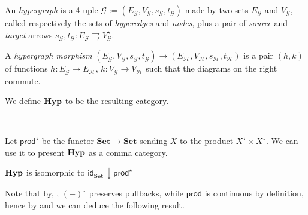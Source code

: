 \documentclass[3p]{elsarticle}
\newcommand{\Set}{\mathbf{Set}}
\def\E{\textbf {\textup{E}}}
\newcommand{\catname}[1]{\textbf{\textup{#1}}}
\newcommand{\hyp}{\catname{Hyp}}
\newcommand{\pro}{\mathsf{prod}}
\renewcommand{\comma}[2]{#1\hspace{1pt} {\downarrow}#2}
\newcommand{\id}[1]{\mathsf{id}_{#1}}
\theoremstyle{remark}
\theoremstyle{definition}
\begin{document}
\noindent
\begin{minipage}[l]{.83\linewidth}
	\setlength{\parindent}{1.5em}
	\begin{defi}An \emph{hypergraph} is a 4-uple $\mathcal{G}:=(E_\mathcal{G}, V_\mathcal{G}, s_\mathcal{G}, t_\mathcal{G})$ made by two sets $E_\mathcal{G}$ and $V_\mathcal{G}$, called respectively the sets of \emph{hyperedges} and \emph{nodes}, plus a pair of \emph{source} and \emph{target} arrows  $s_\mathcal{G}, t_\mathcal{G}\colon E_\mathcal{G}\rightrightarrows V_\mathcal{G}^\star$. 
		
A \emph{hypergraph morphism} $(E_\mathcal{G}, V_\mathcal{G}, s_\mathcal{G}, t_\mathcal{G})\to (E_\mathcal{H}, V_\mathcal{H}, s_\mathcal{H}, t_\mathcal{H})$ is a pair $(h,k)$ of functions $h\colon E_\mathcal{G}\to E_\mathcal{H}$, $k\colon V_\mathcal{G}\to V_\mathcal{H}$ such that the diagrams on the right commute.

We define $\hyp$ to be the resulting category.
\end{defi}\end{minipage} \hfill 
\begin{minipage}[r]{.15\linewidth}
 \hspace{1pt}\\  
\end{minipage}

Let $\pro^\star$ be the functor $\Set\to \Set$ sending $X$ to the product $X^\star\times X^\star$.  We can use it to present $\hyp$ as a comma category.

\begin{prop}\label{prop:com}
	$\hyp$ is isomorphic to $\comma{\id{\Set}}{\pro^\star}$
\end{prop}

Note that by, , $(-)^\star$ preserves pullbacks, while $\pro$ is continuous by definition, 
hence by  and  we can deduce the following result.


\end{document}
